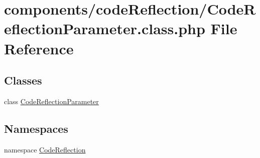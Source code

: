 \hypertarget{_code_reflection_parameter_8class_8php}{
\section{components/codeReflection/CodeReflectionParameter.class.php File Reference}
\label{_code_reflection_parameter_8class_8php}
}
\subsection*{Classes}
\begin{CompactItemize}
\item 
class \hyperlink{class_code_reflection_parameter}{CodeReflectionParameter}
\end{CompactItemize}
\subsection*{Namespaces}
\begin{CompactItemize}
\item 
namespace \hyperlink{namespace_code_reflection}{CodeReflection}
\end{CompactItemize}

